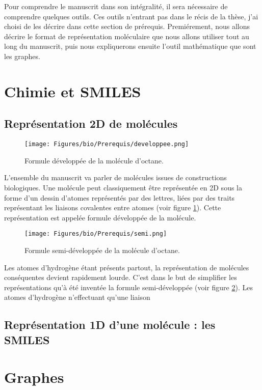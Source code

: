 Pour comprendre le manuscrit dans son intégralité, il sera nécessaire de comprendre quelques outils.
Ces outils n'entrant pas dans le récis de la thèse, j'ai choisi de les décrire dans cette section de prérequis.
Premiérement, nous allons décrire le format de représentation moléculaire que nous allons utiliser tout au long du manuscrit, puis nous expliquerons ensuite l'outil mathématique que sont les graphes.

\section{Chimie et SMILES}

\subsection{Représentation 2D de molécules}

\begin{figure}[h!]
  \begin{center}
    \texttt{[image: Figures/bio/Prerequis/developpee.png]}
    \caption{\label{dev}Formule développée de la molécule d'octane.}
  \end{center}
\end{figure}

L'ensemble du manuscrit va parler de molécules issues de constructions biologiques.
Une molécule peut classiquement être représentée en 2D sous la forme d'un dessin d'atomes représentés par des lettres, liées par des traits représentant les liaisons covalentes entre atomes (voir figure \ref{dev}).
Cette représentation est appelée formule développée de la molécule.

\begin{figure}[h!]
  \begin{center}
    \texttt{[image: Figures/bio/Prerequis/semi.png]}
    \caption{\label{semi}Formule semi-développée de la molécule d'octane.}
  \end{center}
\end{figure}

Les atomes d'hydrogène étant présents partout, la représentation de molécules conséquentes devient rapidement lourde.
C'est dans le but de simplifier les représentations qu'à été inventée la formule semi-développée (voir figure \ref{semi}).
Les atomes d'hydrogène n'effectuant qu'une liaison 


\subsection{Représentation 1D d'une molécule : les SMILES}



\section{Graphes}